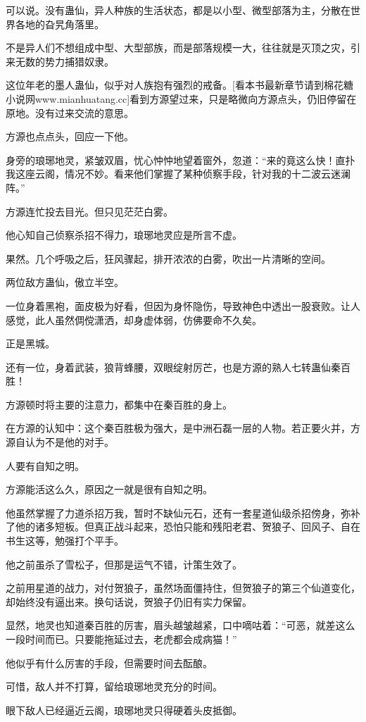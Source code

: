 \begin{this_body}
可以说。没有蛊仙，异人种族的生活状态，都是以小型、微型部落为主，分散在世界各地的旮旯角落里。

不是异人们不想组成中型、大型部族，而是部落规模一大，往往就是灭顶之灾，引来无数的势力捕猎奴隶。

这位年老的墨人蛊仙，似乎对人族抱有强烈的戒备。[看本书最新章节请到棉花糖小说网www.mianhuatang.cc]看到方源望过来，只是略微向方源点头，仍旧停留在原地。没有过来交流的意思。

方源也点点头，回应一下他。

身旁的琅琊地灵，紧皱双眉，忧心忡忡地望着窗外，忽道：“来的竟这么快！直扑我这座云阁，情况不妙。看来他们掌握了某种侦察手段，针对我的十二波云迷澜阵。”

方源连忙投去目光。但只见茫茫白雾。

他心知自己侦察杀招不得力，琅琊地灵应是所言不虚。

果然。几个呼吸之后，狂风骤起，排开浓浓的白雾，吹出一片清晰的空间。

两位敌方蛊仙，傲立半空。

一位身着黑袍，面皮极为好看，但因为身怀隐伤，导致神色中透出一股衰败。让人感觉，此人虽然倜傥潇洒，却身虚体弱，仿佛要命不久矣。

正是黑城。

还有一位，身着武装，狼背蜂腰，双眼绽射厉芒，也是方源的熟人七转蛊仙秦百胜！

方源顿时将主要的注意力，都集中在秦百胜的身上。

在方源的认知中：这个秦百胜极为强大，是中洲石磊一层的人物。若正要火并，方源自认为不是他的对手。

人要有自知之明。

方源能活这么久，原因之一就是很有自知之明。

他虽然掌握了力道杀招万我，暂时不缺仙元石，还有一套星道仙级杀招傍身，弥补了他的诸多短板。但真正战斗起来，恐怕只能和残阳老君、贺狼子、回风子、自在书生这等，勉强打个平手。

他之前虽杀了雪松子，但那是运气不错，计策生效了。

之前用星道的战力，对付贺狼子，虽然场面僵持住，但贺狼子的第三个仙道变化，却始终没有逼出来。换句话说，贺狼子仍旧有实力保留。

显然，地灵也知道秦百胜的厉害，眉头越皱越紧，口中嘀咕着：“可恶，就差这么一段时间而已。只要能拖延过去，老虎都会成病猫！”

他似乎有什么厉害的手段，但需要时间去酝酿。

可惜，敌人并不打算，留给琅琊地灵充分的时间。

眼下敌人已经逼近云阁，琅琊地灵只得硬着头皮抵御。


\end{this_body}
